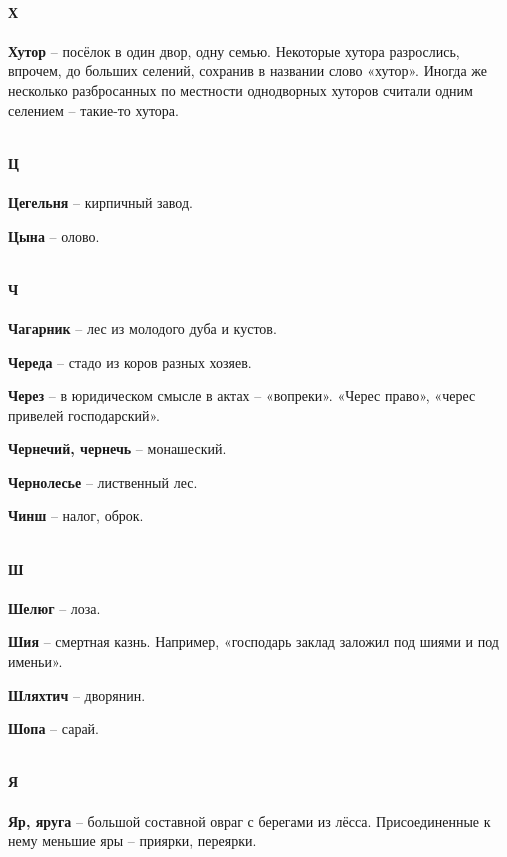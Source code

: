 \begin{multicols}{2}
\mbox{ }\\
\textbf{Х\\}
\mbox{ }\\

\textbf{Хутор} – посёлок в один двор, одну семью. Некоторые хутора разрослись, впрочем, до больших селений, сохранив в названии слово «хутор». Иногда же несколько разбросанных по местности однодворных хуторов считали одним селением – такие-то хутора.

\mbox{ }\\
\textbf{Ц\\}
\mbox{ }\\

\textbf{Цегельня} – кирпичный завод.

\textbf{Цына} – олово.

\mbox{ }\\
\textbf{Ч\\}
\mbox{ }\\

\textbf{Чагарник} – лес из молодого дуба и кустов.

\textbf{Череда} – стадо из коров разных хозяев.

\textbf{Через} – в юридическом смысле в актах – «вопреки». «Черес право», «черес привелей господарский».

\textbf{Чернечий, чернечь} – монашеский.

\textbf{Чернолесье} – лиственный лес.

\textbf{Чинш} – налог, оброк.

\mbox{ }\\
\textbf{Ш\\}
\mbox{ }\\

\textbf{Шелюг} – лоза.

\textbf{Шия} – смертная казнь. Например, «господарь заклад заложил под шиями и под именьи».

\textbf{Шляхтич} – дворянин.

\textbf{Шопа} – сарай.

\mbox{ }\\
\textbf{Я\\}
\mbox{ }\\

\textbf{Яр, яруга} – большой составной овраг с берегами из лёсса. Присоединенные к нему меньшие яры – приярки, переярки.

\end{multicols}
